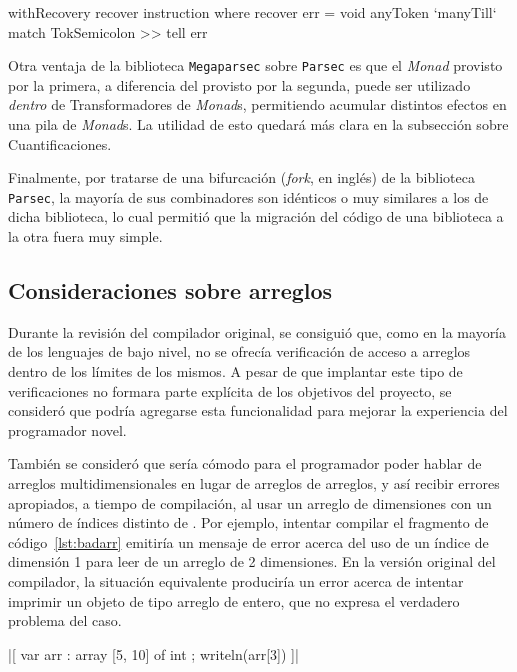 \begin{haskellcode}[caption=Uso de \texttt{withRecovery}, label=lst:withrec]
withRecovery recover instruction
  where
    recover err = void anyToken `manyTill` match TokSemicolon
               >> tell err
\end{haskellcode}

Otra ventaja de la biblioteca \texttt{Megaparsec} sobre \texttt{Parsec} es que
el \emph{Monad} provisto por la primera, a diferencia del provisto por la
segunda, puede ser utilizado \emph{dentro} de Transformadores de \emph{Monad}s,
permitiendo acumular distintos efectos en una pila de \emph{Monad}s. La utilidad
de esto quedará más clara en la subsección sobre Cuantificaciones.

Finalmente, por tratarse de una bifurcación (\emph{fork}, en inglés) de la
biblioteca \texttt{Parsec}, la mayoría de sus combinadores son idénticos o muy
similares a los de dicha biblioteca, lo cual permitió que la migración del
código de una biblioteca a la otra fuera muy simple.

\subsection{Consideraciones sobre arreglos}

Durante la revisión del compilador original, se consiguió que, como en la
mayoría de los lenguajes de bajo nivel, no se ofrecía verificación de acceso a
arreglos dentro de los límites de los mismos. A pesar de que implantar este tipo
de verificaciones no formara parte explícita de los objetivos del proyecto, se
consideró que podría agregarse esta funcionalidad para mejorar la experiencia
del programador novel.

También se consideró que sería cómodo para el programador poder hablar de
arreglos multidimensionales en lugar de arreglos de arreglos, y así recibir
errores apropiados, a tiempo de compilación, al usar un arreglo de 
dimensiones con un número de índices distinto de . Por ejemplo,
intentar compilar el fragmento de código~\ref{lst:badarr} emitiría un mensaje de
error acerca del uso de un índice de dimensión 1 para leer de un arreglo de 2
dimensiones. En la versión original del compilador, la situación equivalente
produciría un error acerca de intentar imprimir un objeto de tipo arreglo de
entero, que no expresa el verdadero problema del caso.

\begin{gracielacode}[caption=Error en dimensiones de arreglo, label=lst:badarr]
|[ var arr : array [5, 10] of int
 ;  writeln(arr[3])
]|
\end{gracielacode}

